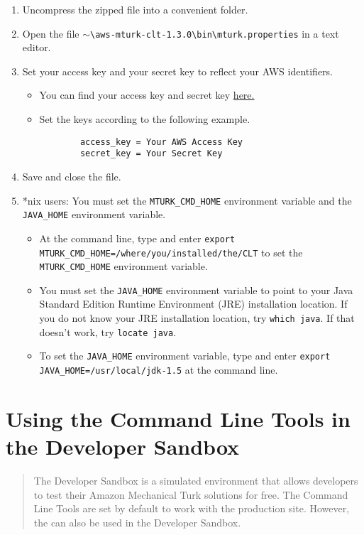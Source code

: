 \documentclass[10pt]{article}
\begin{document}
\begin{enumerate}
	\item Uncompress the zipped file into a convenient folder. 
	\item Open the file $\sim$\verb+\aws-mturk-clt-1.3.0\bin\mturk.properties+ in a text editor.
	\item Set your access key and your secret key to reflect your AWS identifiers.
	\begin{itemize}
		\item You can find your access key and secret key \href{https://aws-portal.amazon.com/gp/aws/securityCredentials}{here.}
		\item Set the keys according to the following example. 
		\begin{verbatim}
		access_key = Your AWS Access Key
		secret_key = Your Secret Key
		\end{verbatim}
	\end{itemize}
	\item Save and close the file.
	\item *nix users: You must set the \verb+MTURK_CMD_HOME+ environment variable and the \verb+JAVA_HOME+ environment variable. 
		\begin{itemize}
			\item At the command line, type and enter \verb+export MTURK_CMD_HOME=/where/you/installed/the/CLT+ to set the \verb+MTURK_CMD_HOME+ environment variable. 
			\item You must set the \verb+JAVA_HOME+ environment variable to point to your Java Standard Edition Runtime Environment (JRE) installation location. If you do not know your JRE installation location, try \verb+which java+. If that doesn't work, try 
\verb+locate java+. 
			\item To set the \verb+JAVA_HOME+ environment variable, type and enter \verb+export JAVA_HOME=/usr/local/jdk-1.5+ at the command line. 
		\end{itemize}
\end{enumerate}

\section*{Using the Command Line Tools in the Developer Sandbox}

\begin{quotation}
The Developer Sandbox is a simulated environment that allows developers to test their Amazon Mechanical Turk solutions for free. The Command Line Tools are set by default to work with the production site. However, the can also be used in the Developer Sandbox. 
\end{quotation}
\end{document}
